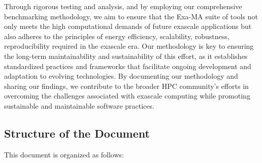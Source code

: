 Through rigorous testing and analysis, and by employing our comprehensive benchmarking methodology, we aim to ensure that the Exa-MA suite of tools not only meets the high computational demands of future exascale applications but also adheres to the principles of energy efficiency, scalability, robustness, reproducibility required in the exascale era. Our methodology is key to ensuring the long-term maintainability and sustainability of this effort, as it establishes standardized practices and frameworks that facilitate ongoing development and adaptation to evolving technologies. By documenting our methodology and sharing our findings, we contribute to the broader HPC community’s efforts in overcoming the challenges associated with exascale computing while promoting sustainable and maintainable software practices.


\subsection{Structure of the Document}
\label{sec:structure}

This document is organized as follows:

